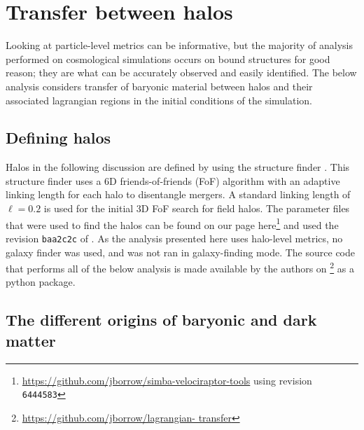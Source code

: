 \section{Transfer between halos}
\label{sec:transfer}

Looking at particle-level metrics can be informative, but the majority of
analysis performed on cosmological simulations occurs on bound structures for
good reason; they are what can be accurately observed and easily identified.
The below analysis considers transfer of baryonic material between halos and
their associated lagrangian regions in the initial conditions of the
simulation.

\subsection{Defining halos}

Halos in the following discussion are defined by using the \velociraptor{} structure
finder \citep{Elahi2019}. This structure finder uses a 6D friends-of-friends (FoF) algorithm
with an adaptive linking length for each halo to disentangle mergers. A standard
linking length of $\ell = 0.2$ is used for the initial 3D FoF search for field halos.
The parameter files that were used to find the halos can be found on our \github{}
page here\footnote{\url{https://github.com/jborrow/simba-velociraptor-tools} using
revision {\tt 6444583}} and used the revision {\tt baa2c2c} of
\velociraptor{}. As the analysis presented here uses halo-level metrics, no galaxy
finder was used, and \velociraptor{} was not ran in galaxy-finding mode.
The source code that performs all of the below analysis is made available by
the authors on \github{}\footnote{\url{https://github.com/jborrow/lagrangian-
transfer}} as a python package.

\subsection{The different origins of baryonic and dark matter}

